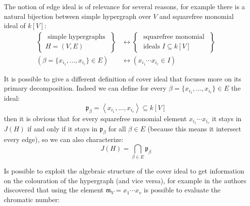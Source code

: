 \documentclass[notitlepage, a4]{book}
\theoremstyle{plain}
\theoremstyle{remark}
\theoremstyle{definition}
\newcommand{\p}{\mathfrak{p}}
\newcommand{\mm}{\mathfrak{m}}
\begin{document}
The notion of edge ideal is of relevance for several reasons, for example there is a natural bijection between simple hypergraph over $ V $ and squarefree monomial ideal of $ k[V] $:
\begin{align*} \label{eq:bij}
\left\{\begin{array}{c}
\text { simple hypergraphs } \\
H=(V, E)
\end{array}\right\}
&  \leftrightarrow\left 
\{\begin{array}{c}
\text { squarefree monomial } \\
\text { ideals } I \subseteq k\left[V \right]
\end{array}\right\} \\
(\beta = \{ x_{i_1} , ... , x_{i_r}\} \in E )
&  \leftrightarrow  
(x_{i_1} \cdots x_{i_r} \in I)
\end{align*}


It is possible to give a different definition of cover ideal that focuses more on its primary decomposition. Indeed we can define for every $ \beta = \{ x_{i_1} , ... , x_{i_r}\} \in E  $ the ideal:
\begin{equation}\label{eq:prime}
\p_\beta = \left\langle  x_{i_1} , ... , x_{i_r} \right\rangle \subseteq k[V]
\end{equation}
then it is obvious that for every squarefree monomial element $ x_{i_1} \cdots x_{i_r} $ it stays in $ J(H) $ if and only if it stays in $ \p_\beta $ for all $ \beta \in E $ (because this means it intersect every edge), so we can also characterize: 
\begin{equation}\label{eq:coverideal2}
J(H) = \bigcap_{\beta \in E} \p_\beta
\end{equation}

%



Is possible to exploit the algebraic structure of the cover ideal to get information on the colouration of the hypergraph (and vice versa), for example in \cite{Fran10Colourings} the authors discovered that using the element $  \mm_V = x_1 \cdots x_v  $ is possible to evaluate the chromatic number:
\end{document}
